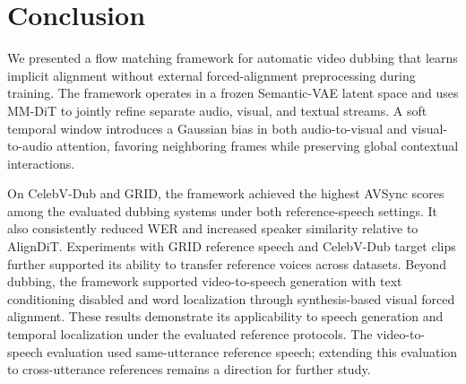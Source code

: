 \section{Conclusion}
\label{sec:conclusion}

We presented a flow matching framework for automatic video dubbing that learns implicit alignment without external forced-alignment preprocessing during training. The framework operates in a frozen Semantic-VAE latent space and uses MM-DiT to jointly refine separate audio, visual, and textual streams. A soft temporal window introduces a Gaussian bias in both audio-to-visual and visual-to-audio attention, favoring neighboring frames while preserving global contextual interactions.

On CelebV-Dub and GRID, the framework achieved the highest AVSync scores among the evaluated dubbing systems under both reference-speech settings. It also consistently reduced WER and increased speaker similarity relative to AlignDiT. Experiments with GRID reference speech and CelebV-Dub target clips further supported its ability to transfer reference voices across datasets. Beyond dubbing, the framework supported video-to-speech generation with text conditioning disabled and word localization through synthesis-based visual forced alignment. These results demonstrate its applicability to speech generation and temporal localization under the evaluated reference protocols. The video-to-speech evaluation used same-utterance reference speech; extending this evaluation to cross-utterance references remains a direction for further study.

